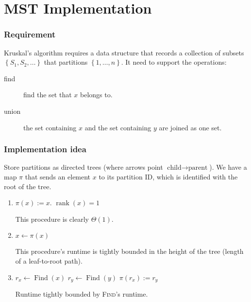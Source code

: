 \chapter{MST Implementation}
\subsection{Requirement}
Kruskal's algorithm requires a data structure that records a collection of subsets \(\left\{S_1, S_2,\ldots\right\}\) that partitions \(\left\{1, \ldots, n\right\}\). It need to support the operations:
\begin{description}
	\item[find] find the set that \(x\) belongs to.
	\item[union] the set containing \(x\) and the set containing \(y\) are joined as one set.
\end{description}
\subsection{Implementation idea}
Store partitions as directed trees (where arrows point \(\text{child}\to\text{parent}\)). We have a map \(\pi\) that sends an element \(x\) to its partition ID, which is identified with the root of the tree.

\begin{enumerate}
	\item 
\begin{algorithmic}
		\State \(\pi(x) := x\).
		\State \(\operatorname{rank}(x) = 1\)
	\EndProcedure
\end{algorithmic}

This procedure is clearly \(\Theta(1)\).

\item 
\begin{algorithmic}
			\State \(x\leftarrow \pi(x)\)
		\EndWhile
	\EndProcedure
\end{algorithmic}

This procedure's runtime is tightly bounded in the height of the tree (length of a leaf-to-root path).

\item 
\begin{algorithmic}
		\State \(r_x\leftarrow \operatorname{Find}(x)\)
		\State \(r_y \leftarrow \operatorname{Find}(y)\)
		\State \(\pi(r_x) := r_y\)
	\EndProcedure
\end{algorithmic}
Runtime tightly bounded by \textsc{Find}'s runtime.
\end{enumerate}

